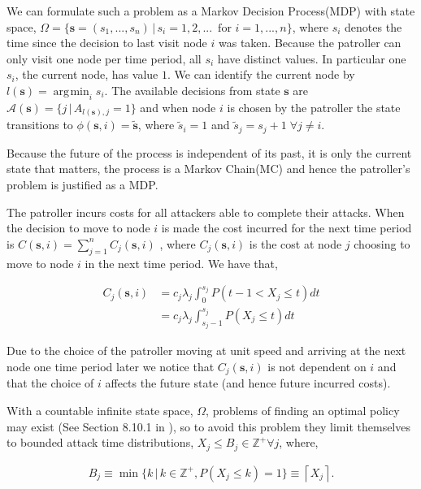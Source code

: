\documentclass[a4paper,10pt]{article}
\newcommand{\ceil}[1]{\left \lceil #1 \right \rceil}
\DeclareMathOperator*{\argmin}{\arg\!\min}
\theoremstyle{definition}
\theoremstyle{definition}
\theoremstyle{remark}
\theoremstyle{definition}
\begin{document}
We can formulate such a problem as a Markov Decision Process(MDP) with state space, $\Omega= \{\bm{s}=(s_{1},...,s_{n}) \, | \, s_{i}=1,2,... \, \text{ for } i=1,...,n \}$,  where $s_{i}$ denotes the time since the decision to last visit node $i$ was taken. Because the patroller can only visit one node per time period, all $s_{i}$ have distinct values. In particular one $s_{i}$, the current node, has value $1$. We can identify the current node by $l(\bm{s})=\argmin_{i} s_{i}$. The available decisions from state $\bm{s}$ are $\mathcal{A}(\bm{s})=\{j \, | \, A_{l(\bm{s}),j}=1 \}$ and when node $i$ is chosen by the patroller the state transitions to $\phi(\bm{s},i)=\widetilde{\bm{s}}$, where $\widetilde{s}_{i}=1$ and $\widetilde{s}_{j}=s_{j}+1 \; \forall j \neq i$.

Because the future of the process is independent of its past, it is only the current state that matters, the process is a Markov Chain(MC) and hence the patroller's problem is justified as a MDP.

The patroller incurs costs for all attackers able to complete their attacks. When the decision to move to node $i$ is made the cost incurred for the next time period is $C(\bm{s},i)=\sum\limits_{j=1}^{n} C_{j}(\bm{s},i)$ , where $C_{j}(\bm{s},i)$ is the cost at node $j$ choosing to move to node $i$ in the next time period. We have that,

\begin{align*}
C_{j}(\bm{s},i)&=c_{j} \lambda_{j} \int_{0}^{s_{j}} P(t-1 < X_{j} \leq t) dt \\
&=c_{j} \lambda_{j} \int_{s_{j}-1}^{s_{j}} P(X_{j} \leq t) dt
\end{align*}

Due to the choice of the patroller moving at unit speed and arriving at the next node one time period later we notice that $C_{j}(\bm{s},i)$ is not dependent on $i$ and that the choice of $i$ affects the future state (and hence future incurred costs).
  
With a countable infinite state space, $\Omega$, problems of finding an optimal policy may exist (See Section 8.10.1 in \cite{Puterman1994}), so to avoid this problem they limit themselves to bounded attack time distributions, $X_{j} \leq B_{j} \in \mathbb{Z}^{+} \forall j $, where,

\begin{align}
\label{Equation:Definition of attack time bound}
B_{j} \equiv \min \{ k \, | \, k \in \mathbb{Z}^{+} , P(X_{j} \leq k)=1 \} \equiv \ceil{X_{j}}.
\end{align}
\end{document}
